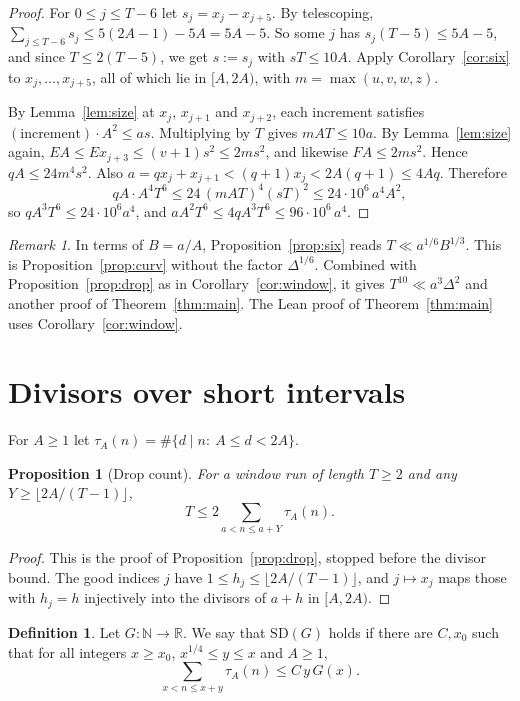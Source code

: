 \documentclass[11pt]{amsart}
\newtheorem{proposition}[theorem]{Proposition}
\theoremstyle{definition}
\newtheorem{definition}[theorem]{Definition}
\theoremstyle{remark}
\newtheorem{remark}[theorem]{Remark}
\begin{document}
\begin{proof}
For $0\le j\le T-6$ let $s_j=x_j-x_{j+5}$. By telescoping,
$\sum_{j\le T-6}s_j\le 5(2A-1)-5A=5A-5$. So some $j$ has $s_j(T-5)\le 5A-5$, and since
$T\le 2(T-5)$, we get $s:=s_j$ with $sT\le 10A$. Apply Corollary~\ref{cor:six} to
$x_j,\dots,x_{j+5}$, all of which lie in $[A,2A)$, with $m=\max(u,v,w,z)$.

By Lemma~\ref{lem:size} at $x_j$, $x_{j+1}$ and $x_{j+2}$, each increment satisfies
$(\text{increment})\cdot A^2\le a s$. Multiplying by $T$ gives $mAT\le 10a$. By
Lemma~\ref{lem:size} again, $EA\le Ex_{j+3}\le(v+1)s^2\le 2ms^2$, and likewise $FA\le 2ms^2$.
Hence $qA\le 24m^4s^2$. Also $a=qx_j+x_{j+1}<(q+1)x_j<2A(q+1)\le 4Aq$. Therefore
\[
qA\cdot A^4T^6\le 24\,(mAT)^4(sT)^2\le 24\cdot10^6\,a^4A^2,
\]
so $qA^3T^6\le 24\cdot 10^6a^4$, and $aA^2T^6\le 4qA^3T^6\le 96\cdot10^6\,a^4$.
\end{proof}

\begin{remark}
In terms of $B=a/A$, Proposition~\ref{prop:six} reads $T\ll a^{1/6}B^{1/3}$. This is
Proposition~\ref{prop:curv} without the factor $\Delta^{1/6}$. Combined with
Proposition~\ref{prop:drop} as in Corollary~\ref{cor:window}, it gives $T^{10}\ll a^3\Delta^2$
and another proof of Theorem~\ref{thm:main}. The Lean proof of Theorem~\ref{thm:main} uses
Corollary~\ref{cor:window}.
\end{remark}

\section{Divisors over short intervals}\label{sec:short}

For $A\ge1$ let $\tau_A(n)=\#\{d\mid n:\ A\le d<2A\}$.

\begin{proposition}[Drop count]\label{prop:dropcount}
For a window run of length $T\ge2$ and any $Y\ge\lfloor 2A/(T-1)\rfloor$,
\[
T\le 2\sum_{a<n\le a+Y}\tau_A(n).
\]
\end{proposition}

\begin{proof}
This is the proof of Proposition~\ref{prop:drop}, stopped before the divisor bound. The good
indices $j$ have $1\le h_j\le\lfloor 2A/(T-1)\rfloor$, and $j\mapsto x_j$ maps those with $h_j=h$
injectively into the divisors of $a+h$ in $[A,2A)$.
\end{proof}

\begin{definition}
Let $G\colon\mathbb N\to\mathbb R$. We say that $\mathrm{SD}(G)$ holds if there are $C,x_0$ such
that for all integers $x\ge x_0$, $x^{1/4}\le y\le x$ and $A\ge1$,
\[
\sum_{x<n\le x+y}\tau_A(n)\le C\,y\,G(x).
\]
\end{definition}
\end{document}
